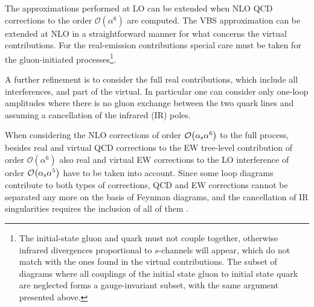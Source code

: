 The approximations performed at LO can be extended when NLO QCD corrections to the order $\mathcal{O}{\left(\alpha^{6}\right)}$ are computed.
The VBS approximation can be extended at NLO in a straightforward manner for what concerns the virtual contributions.
For the real-emission contributions special care must be taken for the gluon-initiated processes\footnote{The initial-state gluon and quark 
    must not couple together, otherwise infrared divergences proportional to $s$-channels will appear, 
     which do not match with the ones found in the virtual contributions.
     The subset of diagrams where all couplings of the initial state gluon to initial state quark are neglected forms a gauge-invariant subset, with the same argument presented above.}.
     \iffalse
This is implemented in the {\sc Powheg-Box}.
This approximation can be used in combination with a double-pole approximation \cite{Dittmaier:2015bfe} for the virtual contribution.
Such an approximation is implemented in {\sc Bonsay}.
In {\sc VBFNLO}, the $s$-channel contributions are available as well and can be
added on top of the VBS approximation. For the real emission diagrams, thereby
as simplification the gluon emission is fully modelled only for initial-state
radiation\AK{I don't understand this sentence. What does 'thereby' refer to?}. The effect of final-state radiation together with the corresponding
virtual contributions is included as a $K$-factor. 
\fi

A further refinement is to consider the full real contributions, which include all interferences, and part of the virtual.
In particular one can consider only one-loop amplitudes where there is no gluon exchange between the two quark lines and 
assuming a cancellation of the infrared (IR) poles.

When considering the NLO corrections of order
$\mathcal{O}{\left(\alpha_{\rm s}\alpha^{6}\right)}$
to the full process, besides real and virtual QCD corrections
to the EW tree-level contribution of order
$\mathcal{O}{\left(\alpha^{6}\right)}$
also real and virtual EW corrections to the LO interference
of order $\mathcal{O}{\left(\alpha_{\rm s}\alpha^{5}\right)}$
have to be taken into account. Since some loop diagrams contribute
to both types of corrections, QCD and EW corrections cannot be
separated any more on the basis of Feynman diagrams, and the
cancellation of IR singularities requires the inclusion of all of them \cite{Biedermann:2017bss}.
